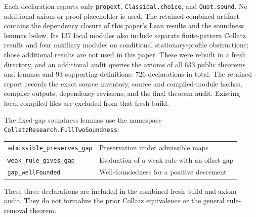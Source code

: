 \documentclass[11pt,a4paper]{article}
\newcommand{\code}[1]{\texttt{#1}}
\begin{document}
Each declaration reports only \code{propext}, \code{Classical.choice},
and \code{Quot.sound}. No additional axiom or proof placeholder is used.
The retained combined artifact contains the dependency closure of this
paper's Lean results and the soundness lemmas below. Its 137 local
modules also include separate finite-pattern Collatz results and four
auxiliary modules on conditional stationary-profile obstructions; those
additional results are not used in this paper.
These were rebuilt in a fresh directory, and an additional audit queries
the axioms of all 633 public theorems and lemmas and 93 supporting
definitions: 726 declarations in total. The retained report records the exact source inventory,
source and compiled-module hashes, compiler outputs, dependency revisions,
and the final theorem audit. Existing local compiled files are excluded
from that fresh build.

The fixed-gap soundness lemmas use the namespace
\code{CollatzResearch.FullTwoSoundness}:
\begin{center}\small
\begin{tabular}{@{}ll@{}}
\code{admissible\_preserves\_gap} & Preservation under admissible maps\\
\code{weak\_rule\_gives\_gap} & Evaluation of a weak rule with an offset gap\\
\code{gap\_wellFounded} & Well-foundedness for a positive decrement
\end{tabular}
\end{center}
These three declarations are included in the combined fresh build and
axiom audit. They do not formalize the prior Collatz equivalence or the
general rule-removal theorem.
\end{document}
